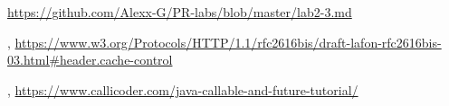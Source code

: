 \begin{thebibliography}{99999}
\singlespace\normalsize

  \url{https://github.com/Alexx-G/PR-labs/blob/master/lab2-3.md}

, \url{https://www.w3.org/Protocols/HTTP/1.1/rfc2616bis/draft-lafon-rfc2616bis-03.html#header.cache-control}

, \url{https://www.callicoder.com/java-callable-and-future-tutorial/}

\end{thebibliography}
